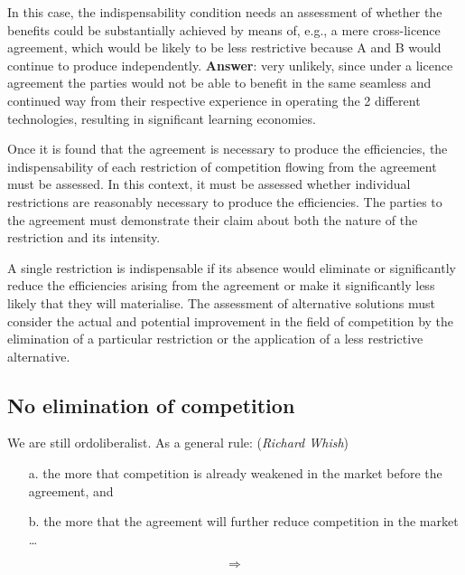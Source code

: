         In this case, the indispensability condition needs an assessment of whether the benefits could be substantially achieved by means of, e.g., a mere cross-licence agreement, which would be likely to be less restrictive because A and B would continue to produce independently.  
        \textbf{Answer}: very unlikely, since under a licence agreement the parties would not be able to benefit in the same seamless and continued way from their respective experience in operating the 2 different technologies, resulting in significant learning economies.
        
        Once it is found that the agreement is necessary to produce the efficiencies, the indispensability of each restriction of competition flowing from the agreement must be assessed. In this context, it must be assessed whether individual restrictions are reasonably necessary to produce the efficiencies. The parties to the agreement must demonstrate their claim about both the nature of the restriction and its intensity.
        
        A single restriction is indispensable if its absence would eliminate or significantly reduce the efficiencies arising from the agreement or make it significantly less likely that they will materialise. The assessment of alternative solutions must consider the actual and potential improvement in the field of competition by the elimination of a particular restriction or the application of a less restrictive alternative.


    \subsection{No elimination of competition}

        We are still ordoliberalist. As a general rule: (\textit{Richard Whish})
        
        \begin{itemize}
            \item[a.] the more that competition is already weakened in the market before the agreement, and
            \item[b.] the more that the agreement will further reduce competition in the market \dots
        \end{itemize}
        
        \[
        \Rightarrow
        \]
        
